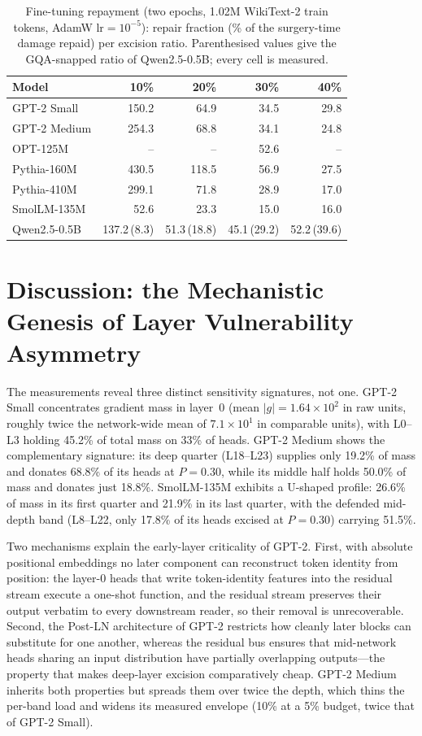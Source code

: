 \documentclass[11pt]{article}
\begin{document}
\begin{table}[!t]
\caption{Fine-tuning repayment (two epochs, 1.02M WikiText-2 train tokens,
AdamW $\mathrm{lr}{=}10^{-5}$): repair fraction (\% of the surgery-time damage
repaid) per excision ratio. Parenthesised values give the GQA-snapped ratio of
Qwen2.5-0.5B; every cell is measured.}
\label{tab:repay}
\centering
\scriptsize
\setlength{\tabcolsep}{3.2pt}
\begin{tabular}{lrrrr}
\toprule
Model & 10\% & 20\% & 30\% & 40\% \\
\midrule
GPT-2 Small & 150.2 & 64.9 & 34.5 & 29.8 \\
GPT-2 Medium & 254.3 & 68.8 & 34.1 & 24.8 \\
OPT-125M & -- & -- & 52.6 & -- \\
Pythia-160M & 430.5 & 118.5 & 56.9 & 27.5 \\
Pythia-410M & 299.1 & 71.8 & 28.9 & 17.0 \\
SmolLM-135M & 52.6 & 23.3 & 15.0 & 16.0 \\
Qwen2.5-0.5B & 137.2\,(8.3) & 51.3\,(18.8) & 45.1\,(29.2) & 52.2\,(39.6) \\
\bottomrule
\end{tabular}
\end{table}

\section{Discussion: the Mechanistic Genesis of Layer Vulnerability Asymmetry}

The measurements reveal three distinct sensitivity signatures, not one.
GPT-2 Small concentrates gradient mass in layer~0 (mean $|g| = 1.64\times10^{2}$ in
raw units, roughly twice the network-wide mean of $7.1\times10^{1}$ in comparable
units), with L0--L3 holding 45.2\% of total mass on 33\% of heads. GPT-2 Medium
shows the complementary signature: its deep quarter (L18--L23) supplies only
19.2\% of mass and donates 68.8\% of its heads at $P{=}0.30$, while its middle half
holds 50.0\% of mass and donates just 18.8\%. SmolLM-135M exhibits a U-shaped
profile: 26.6\% of mass in its first quarter and 21.9\% in its last quarter, with
the defended mid-depth band (L8--L22, only 17.8\% of its heads excised at
$P{=}0.30$) carrying 51.5\%.

Two mechanisms explain the early-layer criticality of GPT-2. First, with absolute
positional embeddings no later component can reconstruct token identity from
position: the layer-0 heads that write token-identity features into the residual
stream execute a one-shot function, and the residual stream preserves their
output verbatim to every downstream reader, so their removal is unrecoverable.
Second, the Post-LN architecture of GPT-2 restricts how cleanly later blocks can
substitute for one another, whereas the residual bus ensures that
mid-network heads sharing an input distribution have partially overlapping
outputs---the property that makes deep-layer excision comparatively cheap.
GPT-2 Medium inherits both properties but spreads them over twice the depth,
which thins the per-band load and widens its measured envelope (10\% at a 5\%
budget, twice that of GPT-2 Small).
\end{document}
